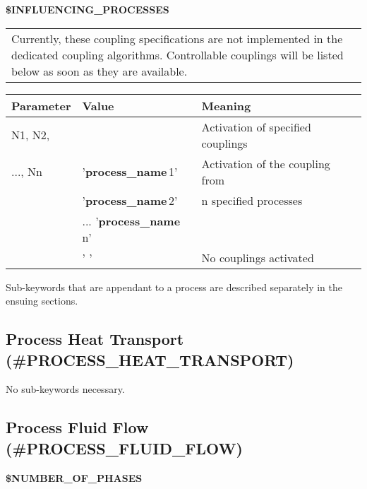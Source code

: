 \vspace{0.5cm}
\newpage
\hspace{1cm} {\bf \$INFLUENCING\_PROCESSES}

\begin{center}
\begin{tabular*}{13.5cm}{p{}}
Currently, these coupling specifications are not implemented in the dedicated coupling
algorithms. Controllable couplings will be listed below as soon as they are available.
\end{tabular*}
\end{center}



\begin{center}
\begin{tabular*}{13cm}{|p{}|p{3.75cm}|p{6.0cm}|} \hline
Parameter& Value & Meaning \\ \hline \hline
%
N1, N2,    &                                    &    Activation of specified couplings        \\
..., Nn    & '{\bf process\_name}\,1'             &    Activation of the coupling from      \\
           & '{\bf process\_name}\,2'             &    n specified processes \\
           & ... '{\bf process\_name}\,n'         &                          \\
           & ' '                                &    No couplings activated  \\ \hline
\end{tabular*}
\end{center}

\vspace{1cm}


Sub-keywords that are appendant to a process are described separately in the ensuing
sections.


\subsection{Process Heat Transport (\#PROCESS\_HEAT\_TRANSPORT)}

No sub-keywords necessary.

\subsection{Process Fluid Flow (\#PROCESS\_FLUID\_FLOW)}


\hspace{1cm} {\bf \$NUMBER\_OF\_PHASES}

